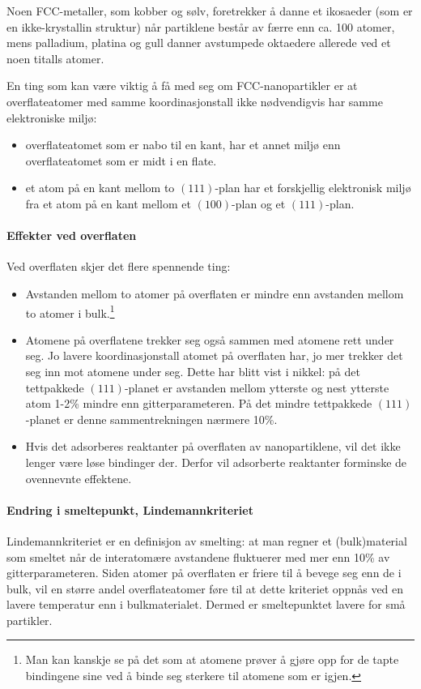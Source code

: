 Noen FCC-metaller, som kobber og sølv, foretrekker å danne et ikosaeder (som er en ikke-krystallin struktur) når partiklene består av færre enn ca. 100 atomer, mens palladium, platina og gull danner avstumpede oktaedere allerede ved et noen titalls atomer.

En ting som kan være viktig å få med seg om FCC-nanopartikler er at overflateatomer med samme koordinasjonstall ikke nødvendigvis har samme elektroniske miljø:
\begin{itemize}
	\item overflateatomet som er nabo til en kant, har et annet miljø enn overflateatomet som er midt i en flate.
	\item et atom på en kant mellom to $(111)$-plan har et forskjellig elektronisk miljø fra et atom på en kant mellom et $(100)$-plan og et $(111)$-plan.
\end{itemize}

\paragraph{Effekter ved overflaten} Ved overflaten skjer det flere spennende ting:
\begin{itemize}
	\item Avstanden mellom to atomer på overflaten er mindre enn avstanden mellom to atomer i bulk.\footnote{Man kan kanskje se på det som at atomene prøver å gjøre opp for de tapte bindingene sine ved å binde seg sterkere til atomene som er igjen.} 
	\item Atomene på overflatene trekker seg også sammen med atomene rett under seg. Jo lavere koordinasjonstall atomet på overflaten har, jo mer trekker det seg inn mot atomene under seg. Dette har blitt vist i nikkel: på det tettpakkede $(111)$-planet er avstanden mellom ytterste og nest ytterste atom 1-2\% mindre enn gitterparameteren. På det mindre tettpakkede $(111)$-planet er denne sammentrekningen nærmere 10\%.
	\item Hvis det adsorberes reaktanter på overflaten av nanopartiklene, vil det ikke lenger være løse bindinger der. Derfor vil adsorberte reaktanter forminske de ovennevnte effektene.
\end{itemize}

\paragraph{Endring i smeltepunkt, Lindemannkriteriet} Lindemannkriteriet er en definisjon av smelting: at man regner et (bulk)material som smeltet når de interatomære avstandene fluktuerer med mer enn 10\% av gitterparameteren. Siden atomer på overflaten er friere til å bevege seg enn de i bulk, vil en større andel overflateatomer føre til at dette kriteriet oppnås ved en lavere temperatur enn i bulkmaterialet. Dermed er smeltepunktet lavere for små partikler.

